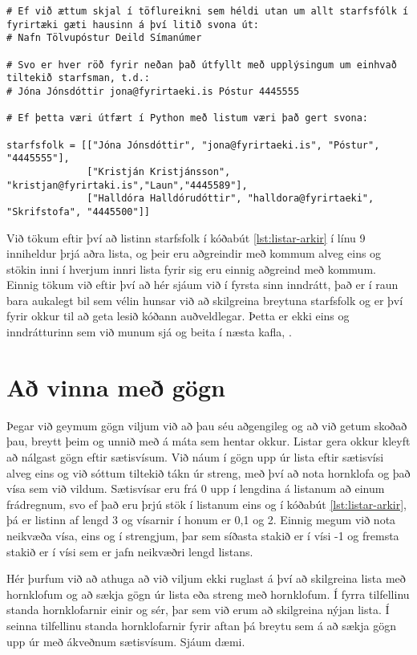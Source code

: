 \begin{lstlisting}[caption=Listar af listum, label=lst:listar-arkir]
# Ef við ættum skjal í töflureikni sem héldi utan um allt starfsfólk í fyrirtæki gæti hausinn á því litið svona út:
# Nafn Tölvupóstur Deild Símanúmer 

# Svo er hver röð fyrir neðan það útfyllt með upplýsingum um einhvað tiltekið starfsman, t.d.:
# Jóna Jónsdóttir jona@fyrirtaeki.is Póstur 4445555

# Ef þetta væri útfært í Python með listum væri það gert svona:

starfsfolk = [["Jóna Jónsdóttir", "jona@fyrirtaeki.is", "Póstur", "4445555"],
			  ["Kristján Kristjánsson", "kristjan@fyrirtaki.is","Laun","4445589"],
			  ["Halldóra Halldórudóttir", "halldora@fyrirtaeki", "Skrifstofa", "4445500"]]

\end{lstlisting}

Við tökum eftir því að listinn starfsfolk í kóðabút \ref{lst:listar-arkir} í línu 9 inniheldur þrjá aðra lista, og þeir eru aðgreindir með kommum alveg eins og stökin inni í hverjum innri lista fyrir sig eru einnig aðgreind með kommum.
Einnig tökum við eftir því að hér sjáum við í fyrsta sinn inndrátt, það er í raun bara aukalegt bil sem vélin hunsar við að skilgreina breytuna starfsfolk og er því fyrir okkur til að geta lesið kóðann auðveldlegar.
Þetta er ekki eins og inndrátturinn sem við munum sjá og beita í næsta kafla, .
 
\section{Að vinna með gögn}\label{uk:gagnavinnsla-listar}
Þegar við geymum gögn viljum við að þau séu aðgengileg og að við getum skoðað þau, breytt þeim og unnið með á máta sem hentar okkur.
Listar gera okkur kleyft að nálgast gögn eftir sætisvísum.
Við náum í gögn upp úr lista eftir sætisvísi alveg eins og við sóttum tiltekið tákn úr streng, með því að nota hornklofa og það vísa sem við vildum.
Sætisvísar eru frá 0 upp í lengdina á listanum að einum frádregnum, svo ef það eru þrjú stök í listanum eins og í kóðabút \ref{lst:listar-arkir}, þá er listinn af lengd 3 og vísarnir í honum er 0,1 og 2.
Einnig megum við nota neikvæða vísa, eins og í strengjum, þar sem síðasta stakið er í vísi -1 og fremsta stakið er í vísi sem er jafn neikvæðri lengd listans.

Hér þurfum við að athuga að við viljum ekki ruglast á því að skilgreina lista með hornklofum og að sækja gögn úr lista eða streng með hornklofum.
Í fyrra tilfellinu standa hornklofarnir einir og sér, þar sem við erum að skilgreina nýjan lista.
Í seinna tilfellinu standa hornklofarnir fyrir aftan þá breytu sem á að sækja gögn upp úr með ákveðnum sætisvísum.
Sjáum dæmi.

